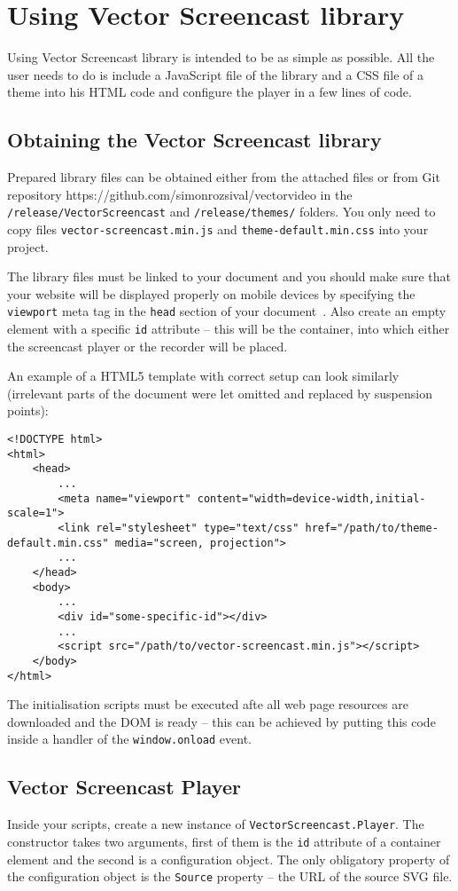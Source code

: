 \chapter{Using Vector Screencast library}
\label{ch:integration}

Using Vector Screencast library is intended to be as simple as possible. All the user needs to do is include a JavaScript file of the library and a CSS file of a theme into his HTML code and configure the player in a few lines of code.

\section{Obtaining the Vector Screencast library}
Prepared library files can be obtained either from the attached files or from Git repository https://github.com/simonrozsival/vectorvideo in the \verb|/release/VectorScreencast| and \verb|/release/themes/| folders. You only need to copy files \verb|vector-screencast.min.js| and \verb|theme-default.min.css| into your project.

The library files must be linked to your document and you should make sure that your website will be displayed properly on mobile devices by specifying the \verb|viewport| meta tag in the \verb|head| section of your document~\cite{html_viewport}. Also create an empty element with a specific \verb|id| attribute -- this will be the container, into which either the screencast player or the recorder will be placed.

An example of a HTML5 template with correct setup can look similarly (irrelevant parts of the document were let omitted and replaced by suspension points):

\begin{lstlisting}
<!DOCTYPE html>
<html>
	<head>
		...
		<meta name="viewport" content="width=device-width,initial-scale=1">
		<link rel="stylesheet" type="text/css" href="/path/to/theme-default.min.css" media="screen, projection">
		...
	</head>
	<body>
		...
		<div id="some-specific-id"></div>
		...
		<script src="/path/to/vector-screencast.min.js"></script>
	</body>
</html>
\end{lstlisting}

The initialisation scripts must be executed afte all web page resources are downloaded and the DOM is ready -- this can be achieved by putting this code inside a handler of the \verb|window.onload| event.

\section{Vector Screencast Player}
Inside your scripts, create a new instance of \verb|VectorScreencast.Player|. The constructor takes two arguments, first of them is the \verb|id| attribute of a container element and the second is a configuration object. The only obligatory property of the configuration object is the \verb|Source| property -- the URL of the source SVG file. 

